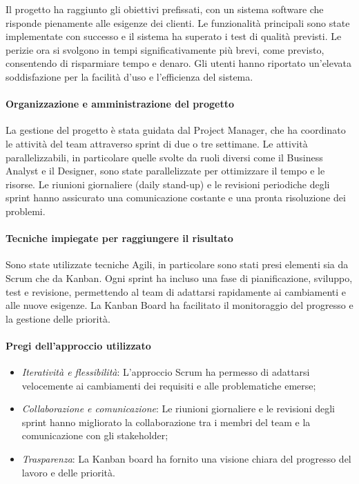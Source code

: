 \documentclass[a4paper,12pt, openright]{report}
\begin{document}
Il progetto ha raggiunto gli obiettivi prefissati, con un sistema software che risponde pienamente alle esigenze dei clienti. Le funzionalità principali sono state implementate con successo e il sistema ha superato i test di qualità previsti. Le perizie ora si svolgono in tempi significativamente più brevi, come previsto, consentendo di risparmiare tempo e denaro. Gli utenti hanno riportato un'elevata soddisfazione per la facilità d'uso e l'efficienza del sistema.

\paragraph{Organizzazione e amministrazione del progetto}

La gestione del progetto è stata guidata dal Project Manager, che ha coordinato le attività del team attraverso sprint di due o tre settimane. Le attività parallelizzabili, in particolare quelle svolte da ruoli diversi come il Business Analyst e il Designer, sono state parallelizzate per ottimizzare il tempo e le risorse. Le riunioni giornaliere (daily stand-up) e le revisioni periodiche degli sprint hanno assicurato una comunicazione costante e una pronta risoluzione dei problemi.

\paragraph{Tecniche impiegate per raggiungere il risultato}

Sono state utilizzate tecniche Agili, in particolare sono stati presi elementi sia da Scrum che da Kanban. Ogni sprint ha incluso una fase di pianificazione, sviluppo, test e revisione, permettendo al team di adattarsi rapidamente ai cambiamenti e alle nuove esigenze. La Kanban Board ha facilitato il monitoraggio del progresso e la gestione delle priorità.

\paragraph{Pregi dell’approccio utilizzato}

\begin{itemize}
    \item \textit{Iteratività e flessibilità}: L'approccio Scrum ha permesso di adattarsi velocemente ai cambiamenti dei requisiti e alle problematiche emerse;
    \item \textit{Collaborazione e comunicazione}: Le riunioni giornaliere e le revisioni degli sprint hanno migliorato la collaborazione tra i membri del team e la comunicazione con gli stakeholder;
    \item \textit{Trasparenza}: La Kanban board ha fornito una visione chiara del progresso del lavoro e delle priorità.
\end{itemize}
\end{document}
